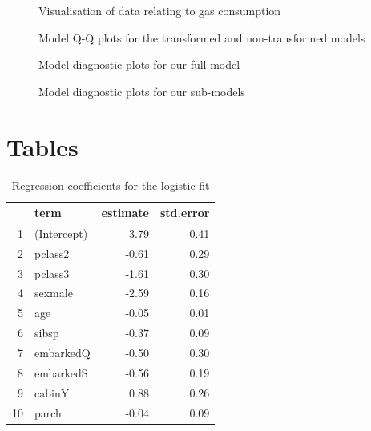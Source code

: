 \documentclass[]{extarticle}
\begin{document}
\begin{figure}[H]
	\centering
	\caption{Visualisation of data relating to gas consumption}
	\label{fig:datavis}
\end{figure}


\begin{figure}[H]
	\centering
	\caption{Model Q-Q plots for the transformed and non-transformed models}
	\label{fig:qqplots}
\end{figure}

\begin{figure}[H]
	\centering
	\caption{Model diagnostic plots for our full model}
	\label{fig:fmdiag}
\end{figure}

\begin{figure}[H]
	\centering
	\caption{Model diagnostic plots for our sub-models}
	\label{fig:smdiag}
\end{figure}

\section{Tables}
\begin{table}[H]
	\centering
	\begin{tabular}{rlrr}
		\hline
		& term & estimate & std.error \\ 
		\hline
		1 & (Intercept) & 3.79 & 0.41 \\ 
		2 & pclass2 & -0.61 & 0.29 \\ 
		3 & pclass3 & -1.61 & 0.30 \\ 
		4 & sexmale & -2.59 & 0.16 \\ 
		5 & age & -0.05 & 0.01 \\ 
		6 & sibsp & -0.37 & 0.09 \\ 
		7 & embarkedQ & -0.50 & 0.30 \\ 
		8 & embarkedS & -0.56 & 0.19 \\ 
		9 & cabinY & 0.88 & 0.26 \\ 
		10 & parch & -0.04 & 0.09 \\ 
		\hline
	\end{tabular}
\caption{Regression coefficients for the logistic fit}
\label{tab:regco}
\end{table}
\end{document}
